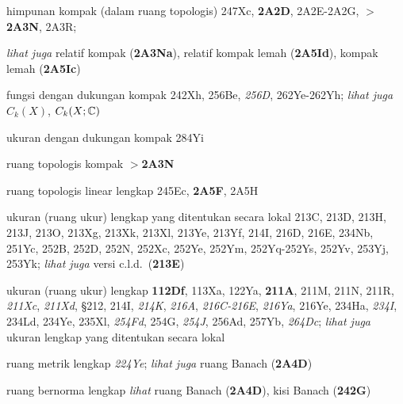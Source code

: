 himpunan kompak (dalam ruang topologis) 247Xc, {\bf 2A2D}, 2A2E-2A2G, $\pmb{>}${\bf 2A3N}, 2A3R;  
  
  {\it lihat juga} relatif kompak ({\bf 2A3Na}), relatif kompak lemah ({\bf 2A5Id}), kompak lemah ({\bf 2A5Ic})




fungsi dengan dukungan kompak 242Xh, 256Be, {\it 256D}, 262Ye-262Yh; {\it lihat juga} $C_k(X)$, $C_k(X;\Bbb C)$


ukuran dengan dukungan kompak 284Yi





ruang topologis kompak {\bf $\pmb{>}$2A3N}






























ruang topologis linear lengkap 245Ec, {\bf 2A5F}, 2A5H


ukuran (ruang ukur) lengkap yang ditentukan secara lokal 213C, 213D, 213H, 213J, 213O, 213Xg, 213Xk, 213Xl, 213Ye, 213Yf, 214I, 216D, 216E, 234Nb, 251Yc, 252B, 252D, 252N, 252Xc, 252Ye, 252Ym, 252Yq-252Ys, 252Yv, 253Yj, 253Yk; {\it lihat juga} versi c.l.d.\ ({\bf 213E})





ukuran (ruang ukur) lengkap {\bf 112Df}, 113Xa, 122Ya, {\bf 211A}, 211M, 211N, 211R, {\it 211Xc}, {\it 211Xd}, \S212, 214I, {\it 214K}, {\it 216A}, {\it 216C-216E}, {\it 216Ya}, 216Ye, 234Ha, {\it 234I}, 234Ld, 234Ye, 235Xl, {\it 254Fd}, 254G, {\it 254J}, 256Ad, 257Yb, {\it 264Dc}; {\it lihat juga} ukuran lengkap yang ditentukan secara lokal
  


ruang metrik lengkap {\it 224Ye}; {\it lihat juga} ruang Banach ({\bf 2A4D})


ruang bernorma lengkap {\it lihat} ruang Banach ({\bf 2A4D}), kisi Banach ({\bf 242G})


